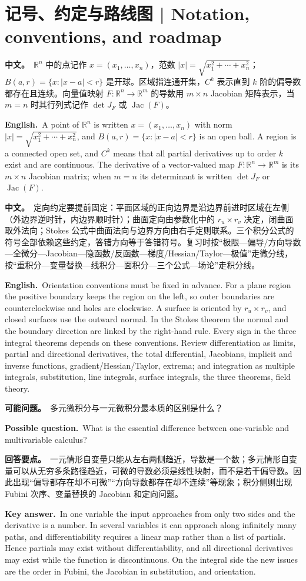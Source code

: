 \documentclass[UTF8,11pt,a4paper]{ctexart}
\newcommand{\BOTH}[2]{\par\noindent\textbf{中文。}\ #1\par\noindent\textbf{English.}\ #2\par}
\newcommand{\ASK}[4]{\begin{samepage}\par\noindent\textbf{可能问题。}\ #1\par\noindent\textbf{Possible question.}\ #2\par\noindent\textbf{回答要点。}\ #3\par\noindent\textbf{Key answer.}\ #4\medskip\end{samepage}}
\begin{document}
\section*{记号、约定与路线图 | Notation, conventions, and roadmap}
\BOTH{$\mathbb R^n$ 中的点记作 $x=(x_1,\ldots,x_n)$，范数 $|x|=\sqrt{x_1^2+\cdots+x_n^2}$；$B(a,r)=\{x:|x-a|<r\}$ 是开球。区域指连通开集，$C^k$ 表示直到 $k$ 阶的偏导数都存在且连续。向量值映射 $F:\mathbb R^n\to\mathbb R^m$ 的导数用 $m\times n$ Jacobian 矩阵表示，当 $m=n$ 时其行列式记作 $\det J_F$ 或 $\operatorname{Jac}(F)$。}{A point of $\mathbb R^n$ is written $x=(x_1,\ldots,x_n)$ with norm $|x|=\sqrt{x_1^2+\cdots+x_n^2}$, and $B(a,r)=\{x:|x-a|<r\}$ is an open ball. A region is a connected open set, and $C^k$ means that all partial derivatives up to order $k$ exist and are continuous. The derivative of a vector-valued map $F:\mathbb R^n\to\mathbb R^m$ is its $m\times n$ Jacobian matrix; when $m=n$ its determinant is written $\det J_F$ or $\operatorname{Jac}(F)$.}
\BOTH{定向约定要提前固定：平面区域的正向边界是沿边界前进时区域在左侧（外边界逆时针，内边界顺时针）；曲面定向由参数化中的 $r_u\times r_v$ 决定，闭曲面取外法向；Stokes 公式中曲面法向与边界方向由右手定则联系。三个积分公式的符号全部依赖这些约定，答错方向等于答错符号。复习时按“极限—偏导/方向导数—全微分—Jacobian—隐函数/反函数—梯度/Hessian/Taylor—极值”走微分线，按“重积分—变量替换—线积分—面积分—三个公式—场论”走积分线。}{Orientation conventions must be fixed in advance. For a plane region the positive boundary keeps the region on the left, so outer boundaries are counterclockwise and holes are clockwise. A surface is oriented by $r_u\times r_v$, and closed surfaces use the outward normal. In the Stokes theorem the normal and the boundary direction are linked by the right-hand rule. Every sign in the three integral theorems depends on these conventions. Review differentiation as limits, partial and directional derivatives, the total differential, Jacobians, implicit and inverse functions, gradient/Hessian/Taylor, extrema; and integration as multiple integrals, substitution, line integrals, surface integrals, the three theorems, field theory.}
\ASK{多元微积分与一元微积分最本质的区别是什么？}{What is the essential difference between one-variable and multivariable calculus?}{一元情形自变量只能从左右两侧趋近，导数是一个数；多元情形自变量可以从无穷多条路径趋近，可微的导数必须是线性映射，而不是若干偏导数。因此出现“偏导都存在却不可微”“方向导数都存在却不连续”等现象；积分侧则出现 Fubini 次序、变量替换的 Jacobian 和定向问题。}{In one variable the input approaches from only two sides and the derivative is a number. In several variables it can approach along infinitely many paths, and differentiability requires a linear map rather than a list of partials. Hence partials may exist without differentiability, and all directional derivatives may exist while the function is discontinuous. On the integral side the new issues are the order in Fubini, the Jacobian in substitution, and orientation.}
\end{document}
